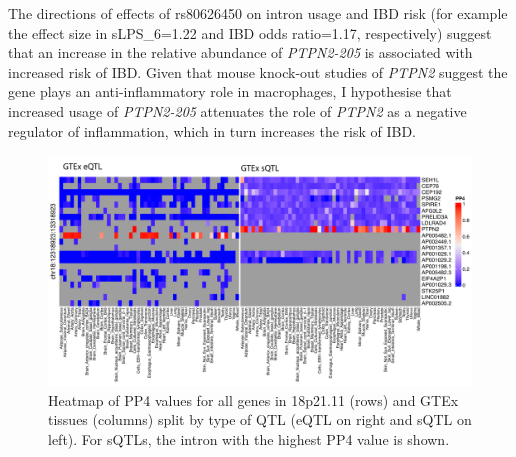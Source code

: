 The directions of effects of rs80626450 on intron usage and IBD risk (for example the effect size in sLPS\_6=1.22  and IBD odds ratio=1.17, respectively) suggest that an increase in the relative abundance of \textit{PTPN2-205} is associated with increased risk of IBD. Given that mouse knock-out studies of \textit{PTPN2} suggest the gene plays an anti-inflammatory role in macrophages, I hypothesise that increased usage of \textit{PTPN2-205} attenuates the role of \textit{PTPN2} as a negative regulator of inflammation, which in turn increases the risk of IBD. 
\begin{figure}[H]
  \centering
  \includegraphics[width=1.0\textwidth]{ptpn2_gtex}
  \caption[Colocalisation of IBD-associated locus with \textit{PTPN2} QTLs in GTEx]{Heatmap of PP4 values for all genes in 18p21.11 (rows) and GTEx tissues (columns) split by type of QTL (eQTL on right and sQTL on left). For sQTLs, the intron with the highest PP4 value is shown.}
  \label{fig:ptpn2_gtex}   
\end{figure}
